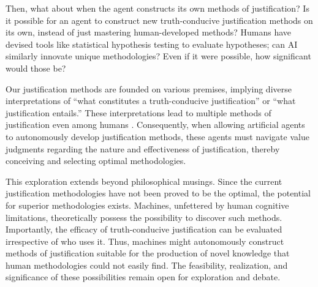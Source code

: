 Then, what about when the agent constructs its own methods of justification? Is it possible for an agent to construct new truth-conducive justification methods on its own, instead of just mastering human-developed methods? Humans have devised tools like statistical hypothesis testing to evaluate hypotheses; can AI similarly innovate unique methodologies? Even if it were possible, how significant would those be?

Our justification methods are founded on various premises, implying diverse interpretations of ``what constitutes a truth-conducive justification'' or ``what justification entails.'' These interpretations lead to multiple methods of justification even among humans \cite{otsuka2022thinking}. Consequently, when allowing artificial agents to autonomously develop justification methods, these agents must navigate value judgments regarding the nature and effectiveness of justification, thereby conceiving and selecting optimal methodologies.

This exploration extends beyond philosophical musings. Since the current justification methodologies have not been proved to be the optimal, the potential for superior methodologies exists. Machines, unfettered by human cognitive limitations, theoretically possess the possibility to discover such methods. Importantly, the efficacy of truth-conducive justification can be evaluated irrespective of who uses it. Thus, machines might autonomously construct methods of justification suitable for the production of novel knowledge that human methodologies could not easily find. The feasibility, realization, and significance of these possibilities remain open for exploration and debate.




